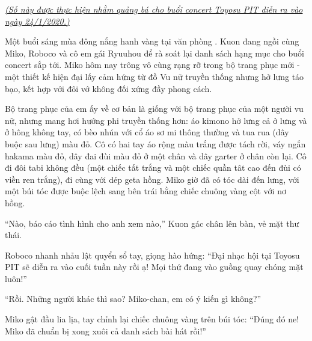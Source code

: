 \documentclass[../main.tex]{subfiles}
\begin{document}

\begin{center}
  \textit{\uline{(Số này được thực hiện nhằm quảng bá cho buổi concert Toyosu PIT diễn ra vào ngày 24/1/2020.)}}
\end{center}

Một buổi sáng mùa đông nắng hanh vàng tại văn phòng \hll. Kuon đang ngồi cùng Miko, Roboco và cô em gái Ryuuhou để rà soát lại danh sách hạng mục cho buổi concert sắp tới. Miko hôm nay trông vô cùng rạng rỡ trong bộ trang phục mới - một thiết kế hiện đại lấy cảm hứng từ đồ Vu nữ truyền thống nhưng hở lưng táo bạo, kết hợp với đôi vớ không đối xứng đầy phong cách.

Bộ trang phục của em ấy về cơ bản là giống với bộ trang phục của một người vu nữ, nhưng mang hơi hướng phi truyền thống hơn: áo kimono hở lưng cả ở lưng và ở hông không tay, có bèo nhún với cổ áo sơ mi thông thường và tua rua (dây buộc sau lưng) màu đỏ. Cô có hai tay áo rộng màu trắng được tách rời, váy ngắn hakama màu đỏ, dây đai đùi màu đỏ ở một chân và dây garter ở chân còn lại. Cô đi đôi tabi không đều (một chiếc tất trắng và một chiếc quần tât cao đến đùi có viền ren trắng), đi cùng với dép geta hồng. Miko giờ đã có tóc dài đến lưng, với một búi tóc được buộc lệch sang bên trái bằng chiếc chuông vàng cột với nơ hồng.


``Nào, báo cáo tình hình cho anh xem nào,'' Kuon gác chân lên bàn, vẻ mặt thư thái.

Roboco nhanh nhảu lật quyển sổ tay, giọng hào hứng: ``Đại nhạc hội tại Toyosu PIT sẽ diễn ra vào cuối tuần này rồi ạ! Mọi thứ đang vào guồng quay chóng mặt luôn!''

``Rồi. Những người khác thì sao? Miko-chan, em có ý kiến gì không?''

Miko gật đầu lia lịa, tay chỉnh lại chiếc chuông vàng trên búi tóc: ``Đúng đó ne! Miko đã chuẩn bị xong xuôi cả danh sách bài hát rồi!''
\end{document}
